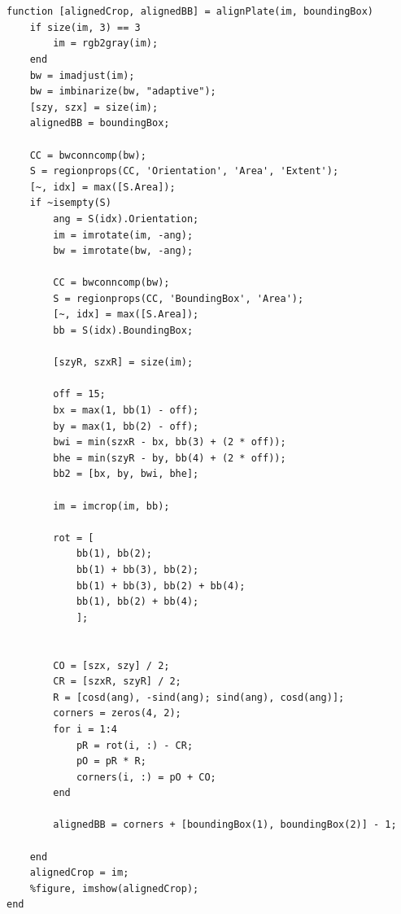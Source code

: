 \begin{verbatim}


function [alignedCrop, alignedBB] = alignPlate(im, boundingBox)
    if size(im, 3) == 3
        im = rgb2gray(im);
    end
    bw = imadjust(im);
    bw = imbinarize(bw, "adaptive");
    [szy, szx] = size(im);
    alignedBB = boundingBox;
    
    CC = bwconncomp(bw);
    S = regionprops(CC, 'Orientation', 'Area', 'Extent');
    [~, idx] = max([S.Area]);
    if ~isempty(S)
        ang = S(idx).Orientation;
        im = imrotate(im, -ang);
        bw = imrotate(bw, -ang);
    
        CC = bwconncomp(bw);
        S = regionprops(CC, 'BoundingBox', 'Area');
        [~, idx] = max([S.Area]);
        bb = S(idx).BoundingBox;
    
        [szyR, szxR] = size(im);
        
        off = 15;
        bx = max(1, bb(1) - off);
        by = max(1, bb(2) - off);
        bwi = min(szxR - bx, bb(3) + (2 * off));
        bhe = min(szyR - by, bb(4) + (2 * off));
        bb2 = [bx, by, bwi, bhe];

        im = imcrop(im, bb);

        rot = [
            bb(1), bb(2);
            bb(1) + bb(3), bb(2);
            bb(1) + bb(3), bb(2) + bb(4);
            bb(1), bb(2) + bb(4);
            ];
    
    
        CO = [szx, szy] / 2;
        CR = [szxR, szyR] / 2;
        R = [cosd(ang), -sind(ang); sind(ang), cosd(ang)];
        corners = zeros(4, 2);
        for i = 1:4
            pR = rot(i, :) - CR;
            pO = pR * R;
            corners(i, :) = pO + CO;
        end
    
        alignedBB = corners + [boundingBox(1), boundingBox(2)] - 1;
    
    end
    alignedCrop = im;
    %figure, imshow(alignedCrop);
end

\end{verbatim}

